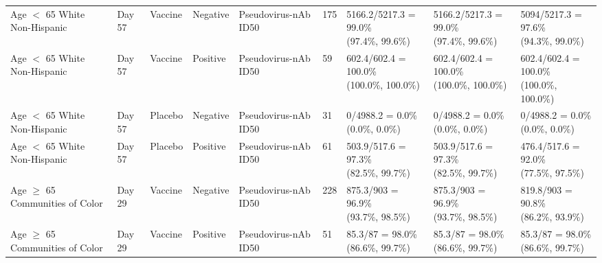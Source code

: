 \documentclass[]{book}
\theoremstyle{definition}
\theoremstyle{definition}
\theoremstyle{definition}
\newcommand{\1}{\mathbbm{1}}
\begin{document}
\begin{landscape}
\begin{ThreePartTable}
\begin{longtable}[t]{>{\raggedright\arraybackslash}p{2.7cm}llllllll}
\hspace{1em}Age $<$ 65 White Non-Hispanic & Day 57 & Vaccine & Negative & Pseudovirus-nAb ID50 & 175 & \makecell[l]{5166.2/5217.3 = 99.0\%\\(97.4\%, 99.6\%)} & \makecell[l]{5166.2/5217.3 = 99.0\%\\(97.4\%, 99.6\%)} & \makecell[l]{5094/5217.3 = 97.6\%\\(94.3\%, 99.0\%)}\\
\hspace{1em}Age $<$ 65 White Non-Hispanic & Day 57 & Vaccine & Positive & Pseudovirus-nAb ID50 & 59 & \makecell[l]{602.4/602.4 = 100.0\%\\(100.0\%, 100.0\%)} & \makecell[l]{602.4/602.4 = 100.0\%\\(100.0\%, 100.0\%)} & \makecell[l]{602.4/602.4 = 100.0\%\\(100.0\%, 100.0\%)}\\
\hspace{1em}Age $<$ 65 White Non-Hispanic & Day 57 & Placebo & Negative & Pseudovirus-nAb ID50 & 31 & \makecell[l]{0/4988.2 = 0.0\%\\(0.0\%, 0.0\%)} & \makecell[l]{0/4988.2 = 0.0\%\\(0.0\%, 0.0\%)} & \makecell[l]{0/4988.2 = 0.0\%\\(0.0\%, 0.0\%)}\\
\hspace{1em}Age $<$ 65 White Non-Hispanic & Day 57 & Placebo & Positive & Pseudovirus-nAb ID50 & 61 & \makecell[l]{503.9/517.6 = 97.3\%\\(82.5\%, 99.7\%)} & \makecell[l]{503.9/517.6 = 97.3\%\\(82.5\%, 99.7\%)} & \makecell[l]{476.4/517.6 = 92.0\%\\(77.5\%, 97.5\%)}\\
\hspace{1em}Age $\geq$ 65 Communities of Color & Day 29 & Vaccine & Negative & Pseudovirus-nAb ID50 & 228 & \makecell[l]{875.3/903 = 96.9\%\\(93.7\%, 98.5\%)} & \makecell[l]{875.3/903 = 96.9\%\\(93.7\%, 98.5\%)} & \makecell[l]{819.8/903 = 90.8\%\\(86.2\%, 93.9\%)}\\
\hspace{1em}Age $\geq$ 65 Communities of Color & Day 29 & Vaccine & Positive & Pseudovirus-nAb ID50 & 51 & \makecell[l]{85.3/87 = 98.0\%\\(86.6\%, 99.7\%)} & \makecell[l]{85.3/87 = 98.0\%\\(86.6\%, 99.7\%)} & \makecell[l]{85.3/87 = 98.0\%\\(86.6\%, 99.7\%)}\\

\end{longtable}
\end{ThreePartTable}
\end{landscape}
\end{document}
